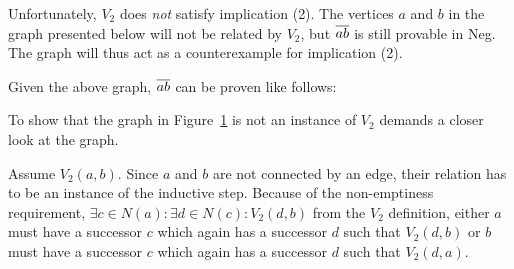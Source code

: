 Unfortunately, $V_2$ does \textit{not} satisfy implication (2).
The vertices $a$ and $b$ in the graph presented below will not be related by $V_2$, but $\ol{ab}$ is still provable in Neg.
The graph will thus act as a counterexample for implication (2).\par
\begin{figure}[!h]
  \centering
  \caption{}
  \label{fig:v2_counter_graph}
\end{figure}
\FloatBarrier
Given the above graph, $\ol{ab}$ can be proven like follows:\par
\begin{figure}[!h]
  \centering
  \begin{prooftree*}
  \end{prooftree*}
  \caption{}
  \label{fig:v2_counter_proof}
\end{figure}
To show that the graph in Figure~\ref{fig:v2_counter_graph} is not an instance of $V_2$ demands a closer look at the graph.

Assume $V_2(a,b)$.
Since $a$ and $b$ are not connected by an edge, their relation has to be an instance of the inductive step.
Because of the non-emptiness requirement, $\exists c \in N(a):\exists d \in N(c): V_2(d,b)$ from the $V_2$ definition, either $a$  must have a successor $c$ which again has a successor $d$ such that $V_2(d,b)$ or $b$ must have a successor $c$ which again has a successor $d$ such that $V_2(d,a)$.

